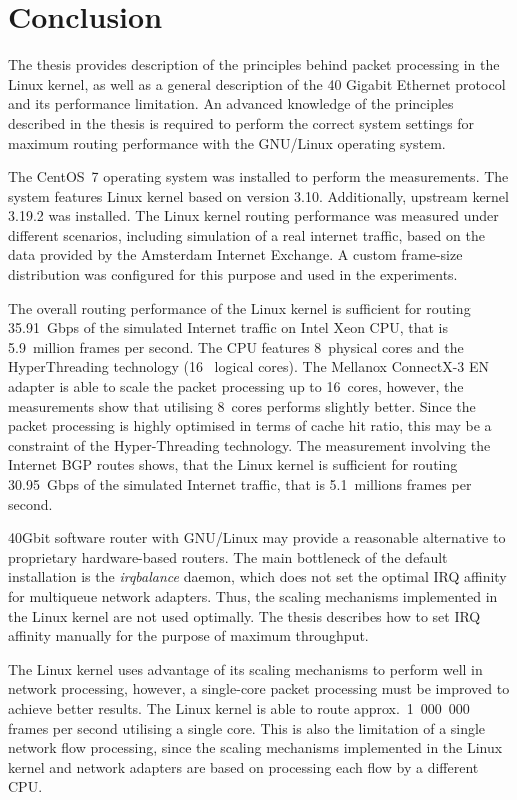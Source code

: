 
\chapter{Conclusion}\label{chap:conclusion}
The thesis provides description of the principles behind packet processing in the Linux kernel, as well as
a general description of the 40 Gigabit Ethernet protocol and its performance limitation.
An advanced knowledge of the principles described in the thesis is required to
perform the correct system settings for maximum routing performance with the GNU/Linux operating system.

The CentOS~7 operating system was installed to perform the measurements.
The system features Linux kernel based on version 3.10.
Additionally, upstream kernel 3.19.2 was installed.
The Linux kernel routing performance was measured under different scenarios, including
simulation of a real internet traffic, based on the data provided by the Amsterdam Internet Exchange.
A custom frame-size distribution was configured for this purpose and used in the experiments.

The overall routing performance of the Linux kernel is sufficient for routing 35.91~Gbps
of the simulated Internet traffic on Intel Xeon CPU, that is 5.9~million frames per second.
The CPU features 8~physical cores and the HyperThreading technology (16~ logical cores).
The Mellanox ConnectX-3 EN adapter is able to scale the packet processing up to 16~cores,
however, the measurements show that utilising 8~cores performs slightly better.
Since the packet processing is highly optimised in terms of cache hit ratio,
this may be a constraint of the Hyper-Threading technology.
The measurement involving the Internet BGP routes shows,
that the Linux kernel is sufficient for routing 30.95~Gbps of the simulated Internet traffic,
that is 5.1~millions frames per second.

40Gbit software router with GNU/Linux may provide a reasonable alternative to proprietary hardware-based routers.
The main bottleneck of the default installation is the {\it{irqbalance}} daemon, which
does not set the optimal IRQ affinity for multiqueue network adapters.
Thus, the scaling mechanisms implemented in the Linux kernel are not used optimally.
The thesis describes how to set IRQ affinity manually for the purpose of maximum throughput.

The Linux kernel uses advantage of its scaling mechanisms to perform well in network processing,
however, a single-core packet processing must be improved to achieve better results.
The Linux kernel is able to route approx.~1~000~000 %
frames per second utilising a single core.
This is also the limitation of a single network flow processing,
since the scaling mechanisms implemented in the Linux kernel and network adapters
are based on processing each flow by a different CPU.


